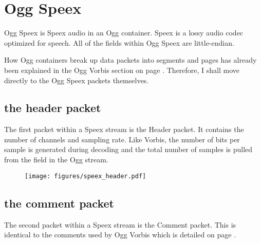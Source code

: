 
\chapter{Ogg Speex}
Ogg Speex is Speex audio in an Ogg container.
Speex is a lossy audio codec optimized for speech.
All of the fields within Ogg Speex are little-endian.

How Ogg containers break up data packets into segments and pages
has already been explained in the Ogg Vorbis section on page \pageref{vorbis}.
Therefore, I shall move directly to the Ogg Speex packets themselves.

\section{the header packet}

The first packet within a Speex stream is the Header packet.
It contains the number of channels and sampling rate.
Like Vorbis, the number of bits per sample is generated during
decoding and the total number of samples is pulled from the
 field in the Ogg stream.

\begin{figure}[h]
\texttt{[image: figures/speex\_header.pdf]}
\end{figure}

\section{the comment packet}

The second packet within a Speex stream is the Comment packet.
This is identical to the comments used by Ogg Vorbis which is
detailed on page \pageref{vorbiscomment}.

